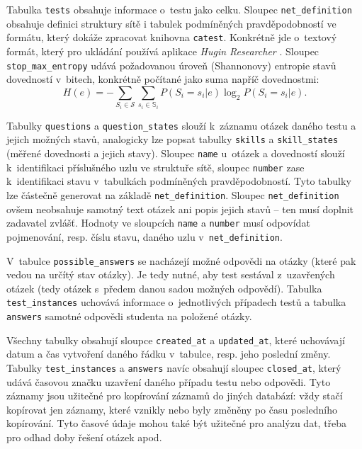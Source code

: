 \documentclass[a4paper,twoside,12pt]{scrbook}
\begin{document}
Tabulka \texttt{tests} obsahuje informace o~testu jako celku. Sloupec \texttt{net\_definition} obsahuje definici struktury sítě i tabulek podmíněných pravděpodobností ve formátu, který dokáže zpracovat knihovna \texttt{catest}. Konkrétně jde o~textový formát, který pro ukládání používá aplikace \textit{Hugin Researcher} \cite{hugin}. Sloupec \texttt{stop\_max\_entropy} udává požadovanou úroveň (Shannonovy) entropie stavů dovedností v~bitech, konkrétně počítané jako suma napříč dovednostmi:
\begin{equation}
	H(e) = -\sum_{S_i \in \mathcal{S}}\sum_{s_i \in \mathbb{S}_i}P(S_i=s_i|e) \log_2 P(S_i=s_i|e).
\end{equation}

Tabulky \texttt{questions} a \texttt{question\_states} slouží k~záznamu otázek daného testu a jejich možných stavů, analogicky lze popsat tabulky \texttt{skills} a \texttt{skill\_states} (měřené dovednosti a jejich stavy). Sloupec \texttt{name} u~otázek a dovedností slouží k~identifikaci příslušného uzlu ve struktuře sítě, sloupec \texttt{number} zase k~identifikaci stavu v~tabulkách podmíněných pravděpodobností. Tyto tabulky lze částečně generovat na základě \texttt{net\_definition}. Sloupec \texttt{net\_definition} ovšem neobsahuje samotný text otázek ani popis jejich stavů -- ten musí doplnit zadavatel zvlášť. Hodnoty ve sloupcích \texttt{name} a \texttt{number} musí odpovídat pojmenování, resp. číslu stavu, daného uzlu v~\texttt{net\_definition}.

V~tabulce \texttt{possible\_answers} se nacházejí možné odpovědi na otázky (které pak vedou na určítý stav otázky). Je tedy nutné, aby test sestával z~uzavřených otázek (tedy otázek s~předem danou sadou možných odpovědí). Tabulka \texttt{test\_instances} uchovává informace o~jednotlivých případech testů a tabulka \texttt{answers} samotné odpovědi studenta na položené otázky.

Všechny tabulky obsahují sloupce \texttt{created\_at} a \texttt{updated\_at}, které uchovávají datum a čas vytvoření daného řádku v~tabulce, resp. jeho poslední změny. Tabulky \texttt{test\_instances} a \texttt{answers} navíc obsahují sloupec \texttt{closed\_at}, který udává časovou značku uzavření daného případu testu nebo odpovědi. Tyto záznamy jsou užitečné pro kopírování záznamů do jiných databází: vždy stačí kopírovat jen záznamy, které vznikly nebo byly změněny po času posledního kopírování. Tyto časové údaje mohou také být užitečné pro analýzu dat, třeba pro odhad doby řešení otázek apod.
\end{document}
